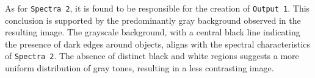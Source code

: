 \documentclass{article}
\begin{document}
\begin{itemize}
			As for {\texttt{Spectra 2}}, it is found to be responsible for the creation of {\texttt{Output 1}}. This conclusion is supported by the predominantly gray background observed in the 
			resulting image. The grayscale background, with a central black line indicating the presence of dark edges around objects, aligns with the spectral characteristics of {\texttt{Spectra 2}}. 
			The absence of distinct black and white regions suggests a more uniform distribution of gray tones, resulting in a less contrasting image.

	\end{itemize}
	
\end{document}
